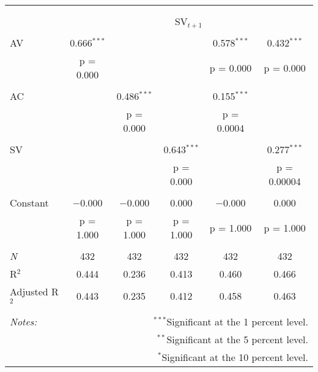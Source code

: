 
\begin{tabular}{@{\extracolsep{5pt}}lccccc} 
\\[-1.8ex]\hline 
\hline \\[-1.8ex] 
\\[-1.8ex] & \multicolumn{5}{c}{SV$_{t+1}$} \\ 
\hline \\[-1.8ex] 
 AV & 0.666$^{***}$ &  &  & 0.578$^{***}$ & 0.432$^{***}$ \\ 
  & p = 0.000 &  &  & p = 0.000 & p = 0.000 \\ 
  & & & & & \\ 
 AC &  & 0.486$^{***}$ &  & 0.155$^{***}$ &  \\ 
  &  & p = 0.000 &  & p = 0.0004 &  \\ 
  & & & & & \\ 
 SV &  &  & 0.643$^{***}$ &  & 0.277$^{***}$ \\ 
  &  &  & p = 0.000 &  & p = 0.00004 \\ 
  & & & & & \\ 
 Constant & $-$0.000 & $-$0.000 & 0.000 & $-$0.000 & 0.000 \\ 
  & p = 1.000 & p = 1.000 & p = 1.000 & p = 1.000 & p = 1.000 \\ 
  & & & & & \\ 
\textit{N} & 432 & 432 & 432 & 432 & 432 \\ 
R$^{2}$ & 0.444 & 0.236 & 0.413 & 0.460 & 0.466 \\ 
Adjusted R$^{2}$ & 0.443 & 0.235 & 0.412 & 0.458 & 0.463 \\ 
\hline 
\hline \\[-1.8ex] 
\textit{Notes:} & \multicolumn{5}{r}{$^{***}$Significant at the 1 percent level.} \\ 
 & \multicolumn{5}{r}{$^{**}$Significant at the 5 percent level.} \\ 
 & \multicolumn{5}{r}{$^{*}$Significant at the 10 percent level.} \\ 
\end{tabular} 
